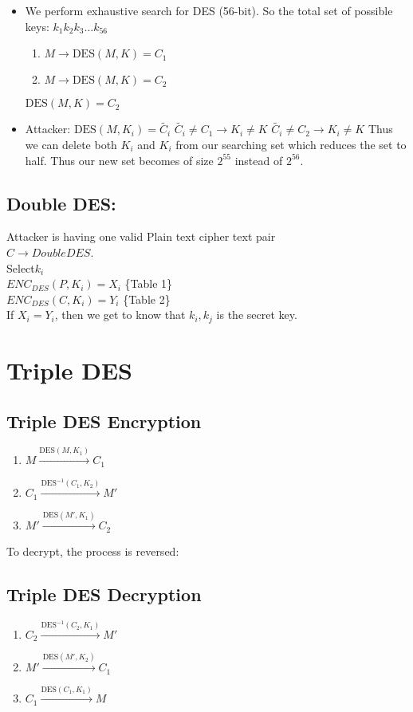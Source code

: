 \documentclass[11pt]{article}
\begin{document}
\begin{itemize}
    \item We perform exhaustive search for DES (56-bit).
    So the total set of possible keys: \(k_1k_2k_3 \ldots k_{56}\)
    \begin{enumerate}
        \item \(M \rightarrow \text{DES}(M, K) = C_1\)
        \item \(M \rightarrow \text{DES}(M, K) = C_2\)
    \end{enumerate}
    \(\text{DES}(M, K) = C_2\)
    \item Attacker: \(\text{DES}(M, K_i) = \tilde{C_i}\)
    \(\tilde{C_i} \neq C_1 \rightarrow K_i \neq K\)
    \(\tilde{C_i} \neq C_2 \rightarrow K_i \neq K\)
    Thus we can delete both \(K_i\) and \(K_i\) from our searching set which reduces the set to half. Thus
    our new set becomes of size \(2^{55}\) instead of \(2^{56}\).
\end{itemize}

\subsection*{Double DES:}
Attacker is having one valid Plain text cipher text pair \\
\(C \rightarrow Double DES\).\\
Select\( k_i\)\\
    \(ENC_{DES}(P,K_i) = X_i\) \{Table 1\} \\
    \(ENC_{DES}(C,K_i) = Y_i\) \{Table 2\} \\
If \(X_i = Y_i\), then we get to know that \(k_i , k_j\) is the secret key.
\section*{Triple DES}
\subsection*{Triple DES Encryption}
\begin{enumerate}
    \item \(M \xrightarrow{\text{DES}(M, K_1)} C_1\)
    \item \(C_1 \xrightarrow{\text{DES}^{-1}(C_1, K_2)} M'\)
    \item \(M' \xrightarrow{\text{DES}(M', K_1)} C_2\)
\end{enumerate}

To decrypt, the process is reversed:

\subsection*{Triple DES Decryption}
\begin{enumerate}
    \item \(C_2 \xrightarrow{\text{DES}^{-1}(C_2, K_1)} M'\)
    \item \(M' \xrightarrow{\text{DES}(M', K_2)} C_1\)
    \item \(C_1 \xrightarrow{\text{DES}(C_1, K_1)} M\)
\end{enumerate}
\end{document}

